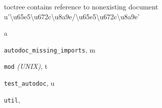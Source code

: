 \documentclass[letterpaper,10pt,english]{sphinxmanual}
\begin{document}
toctree contains reference to nonexisting document u'\textbackslash{}u65e5\textbackslash{}u672c\textbackslash{}u8a9e/\textbackslash{}u65e5\textbackslash{}u672c\textbackslash{}u8a9e'


\begin{thebibliography}{Ref_1}
\end{thebibliography}


\renewcommand{\indexname}{Python Module Index}
\begin{theindex}
\def\bigletter#1{{\Large\sffamily#1}\nopagebreak\vspace{1mm}}
\bigletter{a}
\item {\texttt{autodoc\_missing\_imports}}, \pageref{autodoc:module-autodoc_missing_imports}
\indexspace
\bigletter{m}
\item {\texttt{mod}} \emph{(UNIX)}, \pageref{objects:module-mod}
\indexspace
\bigletter{t}
\item {\texttt{test\_autodoc}}, \pageref{autodoc:module-test_autodoc}
\indexspace
\bigletter{u}
\item {\texttt{util}}, \pageref{autodoc:module-util}
\end{theindex}

\renewcommand{\indexname}{Index}
\printindex
\end{document}
